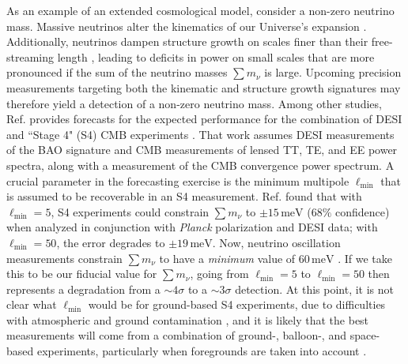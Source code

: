 \documentclass[twocolumn,aps,prd,nofootinbib,showpacs,superscriptaddress]{revtex4-1}
\begin{document}
As an example of an extended cosmological model, consider a non-zero neutrino mass. Massive neutrinos alter the kinematics of our Universe's expansion \cite{pan_and_knox2015}. Additionally, neutrinos dampen structure growth on scales finer than their free-streaming length \cite{hu_and_eisenstein1998,eisenstein_and_hu1999,hu_et_al1998}, leading to deficits in power on small scales that are more pronounced if the sum of the neutrino masses $\sum m_\nu$ is large. Upcoming precision measurements targeting both the kinematic and structure growth signatures may therefore yield a detection of a non-zero neutrino mass. Among other studies, Ref. \cite{allison_et_al2015} provides forecasts for the expected performance for the combination of DESI and ``Stage 4" (S4) CMB experiments \cite{wu_et_al2014,Abazajian_et_al2015}. That work assumes DESI measurements of the BAO signature and CMB measurements of lensed TT, TE, and EE power spectra, along with a measurement of the CMB convergence power spectrum. A crucial parameter in the forecasting exercise is the minimum multipole $\ell_\textrm{min}$ that is assumed to be recoverable in an S4 measurement. Ref. \cite{allison_et_al2015} found that with $\ell_\textrm{min} =  5$, S4 experiments could constrain $\sum m_\nu$ to $\pm 15 \,\textrm{meV}$ ($68\%$ confidence) when analyzed in conjunction with \emph{Planck} polarization and DESI data; with $\ell_\textrm{min} =  50$, the error degrades to $\pm 19 \,\textrm{meV}$. Now, neutrino oscillation measurements constrain $\sum m_\nu$ to have a \emph{minimum} value of $60\,\textrm{meV}$ \cite{smirnov2006,fogli_et_al2012,feldman_et_al2013,Abazajian_et_al2015}. If we take this to be our fiducial value for $\sum m_\nu$, going from $\ell_\textrm{min} =  5$ to $\ell_\textrm{min} =  50$ then represents a degradation from a $\sim\!4 \sigma$ to a $\sim\!3 \sigma$ detection. At this point, it is not clear what $\ell_\textrm{min}$ would be for ground-based S4 experiments, due to difficulties with atmospheric and ground contamination \cite{allison_et_al2015}, and it is likely that the best measurements will come from a combination of ground-, balloon-, and space-based experiments, particularly when foregrounds are taken into account \cite{errard_et_al2015}.
\end{document}
